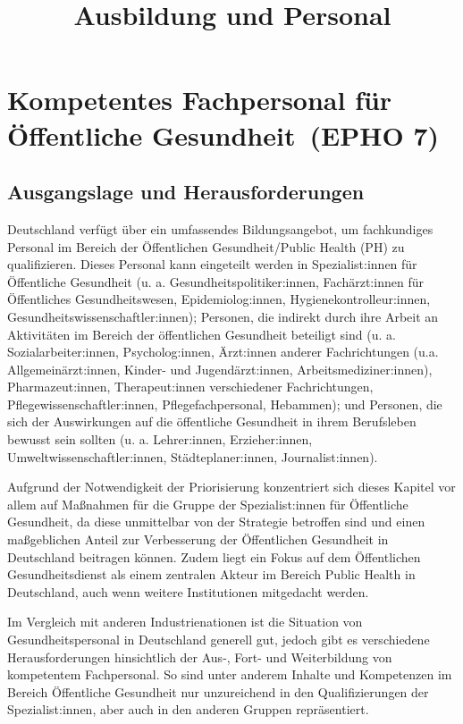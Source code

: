 \documentclass{article}
\begin{document}
\title{Ausbildung und Personal}

\maketitle


\section{Kompetentes Fachpersonal für Öffentliche Gesundheit (EPHO 7)}\label{H3047648}



\subsection{Ausgangslage und Herausforderungen}\label{H3846585}



Deutschland verfügt über ein umfassendes Bildungsangebot, um fachkundiges Personal im Bereich der Öffentlichen Gesundheit/Public Health (PH) zu qualifizieren. Dieses Personal kann eingeteilt werden in Spezialist:innen für Öffentliche Gesundheit (u. a. Gesundheitspolitiker:innen, Fachärzt:innen für Öffentliches Gesundheitswesen, Epidemiolog:innen, Hygienekontrolleur:innen, Gesundheitswissenschaftler:innen); Personen, die indirekt durch ihre Arbeit an Aktivitäten im Bereich der öffentlichen Gesundheit beteiligt sind (u. a. Sozialarbeiter:innen, Psycholog:innen, Ärzt:innen anderer Fachrichtungen (u.a. Allgemeinärzt:innen, Kinder- und Jugendärzt:innen, Arbeitsmediziner:innen), Pharmazeut:innen, Therapeut:innen verschiedener Fachrichtungen, Pflegewissenschaftler:innen, Pflegefachpersonal, Hebammen); und Personen, die sich der Auswirkungen auf die öffentliche Gesundheit in ihrem Berufsleben bewusst sein sollten (u. a. Lehrer:innen, Erzieher:innen, Umweltwissenschaftler:innen, Städteplaner:innen, Journalist:innen). 


Aufgrund der Notwendigkeit der Priorisierung konzentriert sich dieses Kapitel vor allem auf Maßnahmen für die Gruppe der Spezialist:innen für Öffentliche Gesundheit, da diese unmittelbar von der Strategie betroffen sind und einen maßgeblichen Anteil zur Verbesserung der Öffentlichen Gesundheit in Deutschland beitragen können. Zudem liegt ein Fokus auf dem Öffentlichen Gesundheitsdienst als einem zentralen Akteur im Bereich Public Health in Deutschland, auch wenn weitere Institutionen mitgedacht werden.


Im Vergleich mit anderen Industrienationen ist die Situation von Gesundheitspersonal in Deutschland generell gut, jedoch gibt es verschiedene Herausforderungen hinsichtlich der Aus-, Fort- und Weiterbildung von kompetentem Fachpersonal. So sind unter anderem Inhalte und Kompetenzen im Bereich Öffentliche Gesundheit nur unzureichend in den Qualifizierungen der Spezialist:innen, aber auch in den anderen Gruppen repräsentiert.
\end{document}

